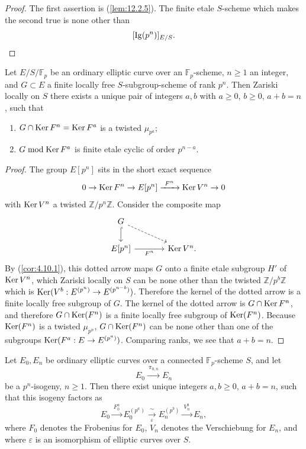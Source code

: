 \begin{proof}
The first assertion is (\ref{lem:12.2.5}). The finite etale $S$-scheme which makes the second true is none other than
\[
[\mathrm{Ig}(p^n)]_{E/S} . \qedhere
\]
\end{proof}

\begin{kprop}\label{prop:13.3.2}
Let $E/S/\mathbb{F}_p$ be an ordinary elliptic curve over an $\mathbb{F}_p$-scheme, $n \ge 1$ an integer, and $G \subset E$ a finite locally free $S$-subgroup-scheme of rank $p^n$. Then Zariski locally on $S$ there exists a unique pair of integers $a, b$ with $a \ge 0$, $b \ge 0$, $a + b = n$, such that
\begin{enumerate}[label=\arabic*)]
\item $G \cap \operatorname{Ker} F^n = \operatorname{Ker} F^a$ is a twisted $\mu_{p^a}$;
\item $G \bmod \operatorname{Ker} F^a$ is finite etale cyclic of order $p^{n-a}$.
\end{enumerate}
\end{kprop}

\begin{proof}
The group $E[p^n]$ sits in the short exact sequence
\[
0 \to \operatorname{Ker} F^n \to E[p^n] \xrightarrow{\ F^n\ } \operatorname{Ker} V^n \to 0
\]
with $\operatorname{Ker} V^n$ a twisted $\mathbb{Z}/p^n\mathbb{Z}$. Consider the composite map
\[
\begin{tikzcd}[row sep=1.8em, column sep=large]
G \arrow[d, hook] \arrow[rd, dashed] & \\
E[p^n] \arrow[r, "F^n"'] & \Ker V^n .
\end{tikzcd}
\]
By (\ref{cor:4.10.1}), this dotted arrow maps $G$ onto a finite etale subgroup $H'$ of $\operatorname{Ker} V^n$, which Zariski locally on $S$ can be none other than the twisted $\mathbb{Z}/p^b\mathbb{Z}$ which is $\operatorname{Ker}(V^b : E^{(p^n)} \to E^{(p^{n-b})})$. Therefore the kernel of the dotted arrow is a finite locally free subgroup of $G$. The kernel of the dotted arrow is $G \cap \operatorname{Ker} F^n$, and therefore $G \cap \operatorname{Ker}(F^n)$ is a finite locally free subgroup of $\operatorname{Ker}(F^n)$. Because $\operatorname{Ker}(F^n)$ is a twisted $\mu_{p^n}$, $G \cap \operatorname{Ker}(F^n)$ can be none other than one of the subgroups $\operatorname{Ker}(F^a : E \to E^{(p^a)})$. Comparing ranks, we see that $a + b = n$.
\end{proof}

\begin{kthm}\label{thm:13.3.3}
Let $E_0, E_n$ be ordinary elliptic curves over a connected $\mathbb{F}_p$-scheme $S$, and let
\[
E_0 \xrightarrow{\ \pi_{0,n}\ } E_n
\]
be a $p^n$-isogeny, $n \ge 1$. Then there exist unique integers $a, b \ge 0$, $a + b = n$, such that this isogeny factors as
\[
E_0 \xrightarrow{\ F_0^a\ } E_0^{(p^a)} \xrightarrow[\varepsilon]{\ \sim\ } E_n^{(p^b)} \xrightarrow{\ V_n^b\ } E_n ,
\]
where $F_0$ denotes the Frobenius for $E_0$, $V_n$ denotes the Verschiebung for $E_n$, and where $\varepsilon$ is an isomorphism of elliptic curves over $S$.
\end{kthm}

